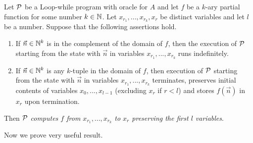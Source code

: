 \documentclass[10pt]{amsart}
\begin{document}
\begin{definition}
	Let ${\mathcal P}$ be a Loop-while program with oracle for $A$ and let $f$ be a $k$-ary partial function for some number $k \in {\mathbb N}$. Let $x_{r_1},...,x_{r_k}, x_r$ be distinct variables and let $l$ be a number. Suppose that the following assertions hold.
	\begin{enumerate}[label=\textbf{(\arabic*)}, leftmargin=3.0em]
		\item If $\vec{n} \in {\mathbb N}^k$ is in the complement of the domain of $f$, then the execution of ${\mathcal P}$ starting from the state with $\vec{n}$ in variables $x_{r_1},...,x_{r_k}$ runs indefinitely.
		\item If $\vec{n} \in {\mathbb N}^k$ is any $k$-tuple in the domain of $f$, then execution of ${\mathcal P}$ starting from the state with $\vec{n}$ in variables $x_{r_1},...,x_{r_k}$ terminates, preserves initial contents of variables $x_0,...,x_{l-1}$ (excluding $x_r$ if $r < l$) and stores $f(\vec{n})$ in $x_r$ upon termination.
	\end{enumerate}
	Then ${\mathcal P}$ \textit{computes $f$ from $x_{r_1},...,x_{r_k}$ to $x_r$ preserving the first $l$ variables}.
\end{definition}
\noindent
Now we prove very useful result.
\end{document}
